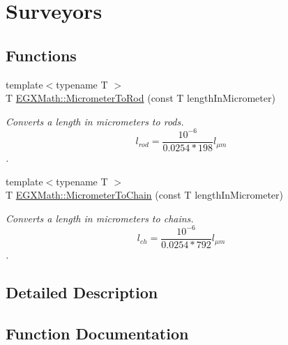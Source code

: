 \hypertarget{group___e_g_x_math-_conversions-_length_conversions-_s_i-_micrometer-_surveyors}{}\section{Surveyors}
\label{group___e_g_x_math-_conversions-_length_conversions-_s_i-_micrometer-_surveyors}
\subsection*{Functions}
\begin{DoxyCompactItemize}
\item 
{\footnotesize template$<$typename T $>$ }\\T \mbox{\hyperlink{group___e_g_x_math-_conversions-_length_conversions-_s_i-_micrometer-_surveyors_ga86e147ebc58116be9c15a873451ac156}{E\+G\+X\+Math\+::\+Micrometer\+To\+Rod}} (const T length\+In\+Micrometer)
\begin{DoxyCompactList}\small\item\em Converts a length in micrometers to rods. \[ l_{rod}= \frac{10^{-6}}{0.0254 * 198} l_{\mu m} \]. \end{DoxyCompactList}\item 
{\footnotesize template$<$typename T $>$ }\\T \mbox{\hyperlink{group___e_g_x_math-_conversions-_length_conversions-_s_i-_micrometer-_surveyors_ga0462dc1021b3979ea0d83113aedbbc4c}{E\+G\+X\+Math\+::\+Micrometer\+To\+Chain}} (const T length\+In\+Micrometer)
\begin{DoxyCompactList}\small\item\em Converts a length in micrometers to chains. \[ l_{ch}= \frac{10^{-6}}{0.0254 * 792} l_{\mu m} \]. \end{DoxyCompactList}\end{DoxyCompactItemize}


\subsection{Detailed Description}


\subsection{Function Documentation}
\mbox{\label{group___e_g_x_math-_conversions-_length_conversions-_s_i-_micrometer-_surveyors_ga0462dc1021b3979ea0d83113aedbbc4c}} 
